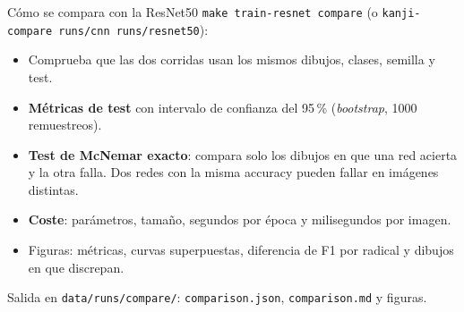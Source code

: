 \documentclass[aspectratio=169,11pt]{beamer}
\begin{document}
\begin{frame}{Cómo se compara con la ResNet50}
  \texttt{make train-resnet compare} (o \texttt{kanji-compare runs/cnn runs/resnet50}):

  \small
  \begin{itemize}
    \item Comprueba que las dos corridas usan los mismos dibujos, clases, semilla y test.
    \item \textbf{Métricas de test} con intervalo de confianza del 95\,\% (\emph{bootstrap}, 1000 remuestreos).
    \item \textbf{Test de McNemar exacto}: compara solo los dibujos en que una red acierta y la otra falla. Dos redes con la misma accuracy pueden fallar en imágenes distintas.
    \item \textbf{Coste}: parámetros, tamaño, segundos por época y milisegundos por imagen.
    \item Figuras: métricas, curvas superpuestas, diferencia de F1 por radical y dibujos en que discrepan.
  \end{itemize}

  \medskip
  Salida en \texttt{data/runs/compare/}: \texttt{comparison.json}, \texttt{comparison.md} y figuras.
\end{frame}
\end{document}
